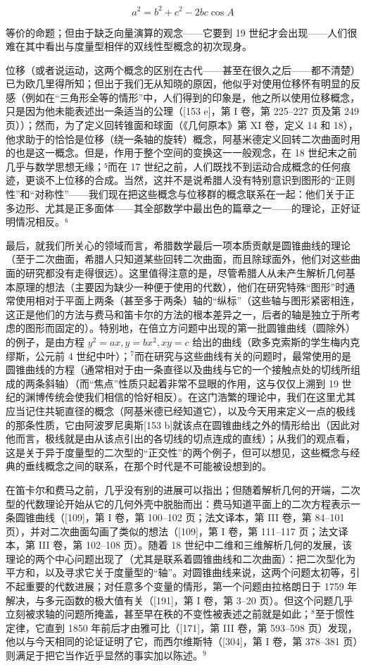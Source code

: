 \[
a ^ {2} = b ^ {2} + c ^ {2} - 2 b c \cos A
\]

等价的命题；但由于缺乏向量演算的观念——它要到 19 世纪才会出现——人们很难在其中看出与度量型相伴的双线性型概念的初次现身。

位移（或者说运动，这两个概念的区别在古代——甚至在很久之后——都不清楚）已为欧几里得所知；但出于我们无从知晓的原因，他似乎对使用位移怀有明显的反感（例如在“三角形全等的情形”中，人们得到的印象是，他之所以使用位移概念，只是因为他未能表述出一条适当的公理（{[}153 e{]}，第 I 卷，第 225–227 页及第 249 页））；然而，为了定义回转锥面和球面（《几何原本》第 XI 卷，定义 14 和 18），他求助于的恰恰是位移（绕一条轴的旋转）概念，阿基米德定义回转二次曲面时用的也是这一概念。但是，作用于整个空间的变换这一一般观念，在 18 世纪末之前几乎与数学思想无缘；⁵而在 17 世纪之前，人们既找不到运动合成概念的任何痕迹，更谈不上位移的合成。当然，这并不是说希腊人没有特别意识到图形的“正则性”和“对称性”——我们现在把这些概念与位移群的概念联系在一起：他们关于正多边形、尤其是正多面体——其全部数学中最出色的篇章之一——的理论，正好证明情况相反。⁶

最后，就我们所关心的领域而言，希腊数学最后一项本质贡献是圆锥曲线的理论（至于二次曲面，希腊人只知道某些回转二次曲面，而且除球面外，他们对这些曲面的研究都没有走得很远）。这里值得注意的是，尽管希腊人从未产生解析几何基本原理的想法（主要因为缺少一种便于使用的代数），他们在研究特殊“图形”时通常使用相对于平面上两条（甚至多于两条）轴的“纵标”（这些轴与图形紧密相连，这正是他们的方法与费马和笛卡尔的方法的根本差异之一，后者的轴是独立于所考虑的图形而固定的）。特别地，在倍立方问题中出现的第一批圆锥曲线（圆除外）的例子，是由方程 \(y^{2}=ax, y=bx^{2}, xy=c\) 给出的曲线（欧多克索斯的学生梅内克缪斯，公元前 4 世纪中叶）；\(^{7}\)而在研究与这些曲线有关的问题时，最常使用的是圆锥曲线的方程（通常相对于由一条直径以及曲线与它的一个接触点处的切线所组成的两条斜轴）（而“焦点”性质只起着非常不显眼的作用，这与仅仅上溯到 19 世纪的渊博传统会使我们相信的恰好相反）。在这门浩繁的理论中，我们在这里尤其应当记住共轭直径的概念（阿基米德已经知道它），以及今天用来定义一点的极线的那条性质，它由阿波罗尼奥斯{[}153 b{]}就该点在圆锥曲线之外的情形给出（因此对他而言，极线就是由从该点引出的各切线的切点连成的直线）；从我们的观点看，这是关于异于度量型的二次型的“正交性”的两个例子，但可以想见，这些概念与经典的垂线概念之间的联系，在那个时代是不可能被设想到的。

在笛卡尔和费马之前，几乎没有别的进展可以指出；但随着解析几何的开端，二次型的代数理论开始从它的几何外壳中脱胎而出：费马知道平面上的二次方程表示一条圆锥曲线（{[}109{]}，第 I 卷，第 100–102 页；法文译本，第 III 卷，第 84–101 页），并对二次曲面勾画了类似的想法（{[}109{]}，第 I 卷，第 111–117 页；法文译本，第 III 卷，第 102–108 页）。随着 18 世纪中二维和三维解析几何的发展，该理论的两个中心问题出现了（尤其是联系着圆锥曲线和二次曲面）：把二次型化为平方和，以及寻求它关于度量型的“轴”。对圆锥曲线来说，这两个问题太初等，引不起重要的代数进展；对任意多个变量的情形，第一个问题由拉格朗日于 1759 年解决，与多元函数的极大值有关（{[}191{]}，第 I 卷，第 3–20 页）。但这个问题几乎立刻被求轴的问题所掩盖，甚至早在秩的不变性被表述之前就是如此；\(^{8}\)至于惯性定律，它直到 1850 年前后才由雅可比（{[}171{]}，第 III 卷，第 593–598 页）发现，他以与今天相同的论证证明了它，而西尔维斯特（{[}304{]}，第 I 卷，第 378–381 页）则满足于把它当作近乎显然的事实加以陈述。\(^{9}\)


